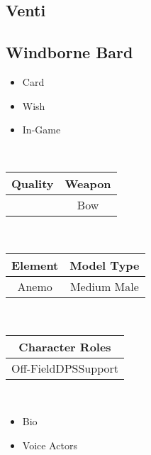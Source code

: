 \documentclass[a4paper,12pt]{article}
\begin{document}
\subsection*{Venti}\n\n\subsection*{Windborne Bard}\n\n\begin{itemize}
\item Card
\item Wish
\item In-Game
\end{itemize}\\ \par \vspace{0.5cm}

\begin{tabular}{|c|c|} \hline
Quality & Weapon \\
 \hline
 & Bow \\
\end{tabular}\\ \par \vspace{0.5cm}

\begin{tabular}{|c|c|} \hline
Element & Model Type \\
 \hline
Anemo & Medium Male \\
\end{tabular}\\ \par \vspace{0.5cm}

\begin{tabular}{|c|} \hline
Character Roles \\
 \hline
Off-FieldDPSSupport \\
\end{tabular}\\ \par \vspace{0.5cm}

\begin{itemize}
\item Bio
\item Voice Actors
\end{itemize}\\ \par \vspace{0.5cm}
\end{document}
